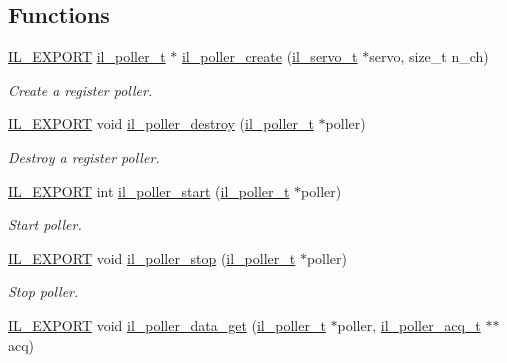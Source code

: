 \subsection*{Functions}
\begin{DoxyCompactItemize}
\item 
\hyperlink{common_8h_a6bb629d26c52bfe10519ba3176853f47}{I\+L\+\_\+\+E\+X\+P\+O\+RT} \hyperlink{group__IL__POLLER_ga896ad3836b2a1e121ce8b0c30c58d3ab}{il\+\_\+poller\+\_\+t} $\ast$ \hyperlink{group__IL__POLLER_gaf1a6d95123039ac685439062c34e7e54}{il\+\_\+poller\+\_\+create} (\hyperlink{group__IL__SERVO_ga3369ddfcc33492fe3a28f96cf455b13e}{il\+\_\+servo\+\_\+t} $\ast$servo, size\+\_\+t n\+\_\+ch)
\begin{DoxyCompactList}\small\item\em Create a register poller. \end{DoxyCompactList}\item 
\hyperlink{common_8h_a6bb629d26c52bfe10519ba3176853f47}{I\+L\+\_\+\+E\+X\+P\+O\+RT} void \hyperlink{group__IL__POLLER_gada8133cbba4d0212e6d5c84dab03d407}{il\+\_\+poller\+\_\+destroy} (\hyperlink{group__IL__POLLER_ga896ad3836b2a1e121ce8b0c30c58d3ab}{il\+\_\+poller\+\_\+t} $\ast$poller)
\begin{DoxyCompactList}\small\item\em Destroy a register poller. \end{DoxyCompactList}\item 
\hyperlink{common_8h_a6bb629d26c52bfe10519ba3176853f47}{I\+L\+\_\+\+E\+X\+P\+O\+RT} int \hyperlink{group__IL__POLLER_ga018f08358312c8610819a47fd9d2509f}{il\+\_\+poller\+\_\+start} (\hyperlink{group__IL__POLLER_ga896ad3836b2a1e121ce8b0c30c58d3ab}{il\+\_\+poller\+\_\+t} $\ast$poller)
\begin{DoxyCompactList}\small\item\em Start poller. \end{DoxyCompactList}\item 
\hyperlink{common_8h_a6bb629d26c52bfe10519ba3176853f47}{I\+L\+\_\+\+E\+X\+P\+O\+RT} void \hyperlink{group__IL__POLLER_ga1055384cca31fe730d07d488017c559f}{il\+\_\+poller\+\_\+stop} (\hyperlink{group__IL__POLLER_ga896ad3836b2a1e121ce8b0c30c58d3ab}{il\+\_\+poller\+\_\+t} $\ast$poller)
\begin{DoxyCompactList}\small\item\em Stop poller. \end{DoxyCompactList}\item 
\hyperlink{common_8h_a6bb629d26c52bfe10519ba3176853f47}{I\+L\+\_\+\+E\+X\+P\+O\+RT} void \hyperlink{group__IL__POLLER_ga67ccc0e92b0bb83756462d3c407d4d87}{il\+\_\+poller\+\_\+data\+\_\+get} (\hyperlink{group__IL__POLLER_ga896ad3836b2a1e121ce8b0c30c58d3ab}{il\+\_\+poller\+\_\+t} $\ast$poller, \hyperlink{structil__poller__acq__t}{il\+\_\+poller\+\_\+acq\+\_\+t} $\ast$$\ast$acq)
$$
\end{DoxyCompactItemize}
